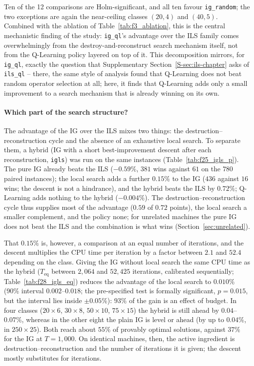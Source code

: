 \documentclass[final,3p,times,11pt,authoryear]{elsarticle}
\begin{document}


Ten of the 12 comparisons are Holm-significant, and all ten favour
\texttt{ig\_random}; the two exceptions are again the near-ceiling
classes $(20,4)$ and $(40,5)$. Combined with the ablation of
Table~\ref{tab:f3_ablation}, this is the central mechanistic finding
of the study: \texttt{ig\_ql}'s advantage over the ILS family comes
overwhelmingly from the destroy-and-reconstruct search mechanism
itself, not from the Q-Learning policy layered on top of it. This
decomposition mirrors, for \texttt{ig\_ql}, exactly the question that
Supplementary Section~\ref{S-sec:ils-chapter} asks of \texttt{ils\_ql} -- there, the
same style of analysis found that Q-Learning does not beat random
operator selection at all; here, it finds that Q-Learning adds only a
small improvement to a search mechanism that is already winning on its
own.

\paragraph{Which part of the search structure?}
The advantage of the IG over the ILS mixes two things: the destruction--reconstruction
cycle and the absence of an exhaustive local search. To separate them, a hybrid
(IG with a short best-improvement descent after each reconstruction, \texttt{igls})
was run on the same instances (Table~\ref{tab:f25_igls_p}). The pure IG already beats
the ILS ($-0.59\%$, $381$ wins against $61$ on the $780$ paired instances); the local
search adds a further $0.15\%$ to the IG ($436$ against $16$ wins; the descent is not
a hindrance), and the hybrid beats the ILS by $0.72\%$; Q-Learning adds nothing to the
hybrid ($-0.004\%$). The destruction--reconstruction cycle thus supplies most of the
advantage ($0.59$ of $0.72$ points), the local search a smaller complement, and the
policy none; for unrelated machines the pure IG does not beat the ILS and the combination
is what wins (Section~\ref{sec:unrelated}).



That $0.15\%$ is, however, a comparison at an equal number of iterations, and the
descent multiplies the CPU time per iteration by a factor between $2.1$ and $52.4$
depending on the class. Giving the IG without local search the same CPU time as the hybrid
($T_{\mathrm{eq}}$ between $2{,}064$ and $52{,}425$ iterations, calibrated sequentially;
Table~\ref{tab:f28_igls_eq}) reduces the advantage of the local search to $0.010\%$
(90\% interval $0.002$--$0.018$; the pre-specified test is formally significant,
$p=0.015$, but the interval lies inside $\pm0.05\%$): $93\%$ of the gain is an effect of
budget. In four classes ($20\times6$, $30\times8$, $50\times10$, $75\times15$) the hybrid
is still ahead by $0.04$--$0.07\%$, whereas in the other eight the plain IG is level or ahead
(by up to $0.04\%$, in $250\times25$). Both reach about $55\%$ of
provably optimal solutions, against $37\%$ for the IG at $T=1{,}000$. On
identical machines, then, the active ingredient is destruction--reconstruction and
the number of iterations it is given; the descent mostly substitutes for iterations.
\end{document}
